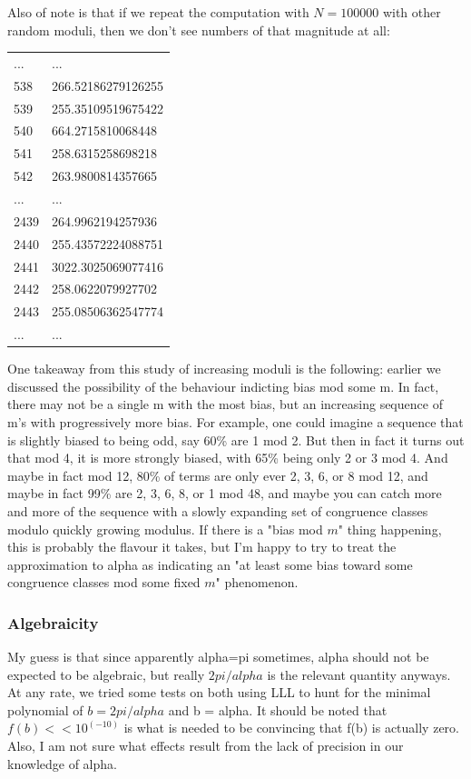 \documentclass{article}
\theoremstyle{definition}
\theoremstyle{remark}
\numberwithin{equation}{section}
\begin{document}
{Also of note is that if we repeat the computation with $N=100000$ with
other random moduli, then we don't see numbers of that magnitude at
all:

\begin{tabular}{ll}
...&...\\
538 & 266.52186279126255\\
539 & 255.35109519675422\\
540 & 664.2715810068448\\
541 & 258.6315258698218\\
542 & 263.9800814357665\\
...&...\\
2439 & 264.9962194257936\\
2440 & 255.43572224088751\\
2441 & 3022.3025069077416\\
2442 & 258.0622079927702\\
2443 & 255.08506362547774\\
...&...\\
\end{tabular}

One takeaway from this study of increasing moduli is the following:
earlier we discussed the possibility of the behaviour indicting bias
mod some m.  In fact, there may not be a single m with the most bias,
but an increasing sequence of m's with progressively more bias.  For
example, one could imagine a sequence that is slightly biased to being
odd, say 60\% are 1 mod 2.  But then in fact it turns out that mod 4,
it is more strongly biased, with 65\% being only 2 or 3 mod 4.  And
maybe in fact mod 12, 80\% of terms are only ever 2, 3, 6, or 8 mod 12,
and maybe in fact 99\% are 2, 3, 6, 8, or 1 mod 48, and maybe you can
catch more and more of the sequence with a slowly expanding set of
congruence classes modulo quickly growing modulus.  If there is a
"bias mod $m$" thing happening, this is probably the flavour it takes,
but I'm happy to try to treat the approximation to alpha as indicating
an "at least some bias toward some congruence classes mod some fixed
$m$" phenomenon.


\subsubsection{Algebraicity}

My guess is that since apparently alpha=pi sometimes, alpha should not
be expected to be algebraic, but really $2pi/alpha$ is the relevant
quantity anyways. At any rate, we tried some tests on both using LLL
to hunt for the minimal polynomial of $b = 2pi/alpha$ and b = alpha. It
should be noted that $f(b) << 10^(-10)$ is what is needed to be
convincing that f(b) is actually zero. Also, I am not sure what
effects result from the lack of precision in our knowledge of alpha.

}
\end{document}
